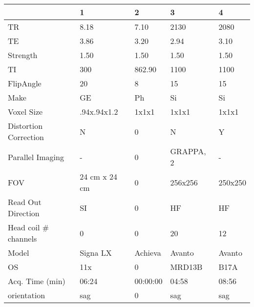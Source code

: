 \begin{table}
[]
\centering
\begin{tabular}{lllll}
\toprule
{} & 1 & 2 & 3 & 4 \\
\midrule
TR                    &               8.18 &               7.10 &                 2130 &                 2080 \\
TE                    &               3.86 &               3.20 &                 2.94 &                 3.10 \\
Strength              &               1.50 &               1.50 &                 1.50 &                 1.50 \\
TI                    &                300 &             862.90 &                 1100 &                 1100 \\
FlipAngle             &                 20 &                  8 &                   15 &                   15 \\
Make                  &                 GE &                 Ph &                   Si &                   Si \\
Voxel Size            &        .94x.94x1.2 &              1x1x1 &                1x1x1 &                1x1x1 \\
Distortion Correction &                  N &                  0 &                    N &                    Y \\
Parallel Imaging      &                  - &                  0 &            GRAPPA, 2 &                    - \\
FOV                   &      24 cm x 24 cm &                  0 &              256x256 &              250x250 \\
Read Out Direction    &                 SI &                  0 &                   HF &                   HF \\
Head coil \# channels  &                  0 &                  0 &                   20 &                   12 \\
Model                 &           Signa LX &            Achieva &               Avanto &               Avanto \\
OS                    &                11x &                  0 &               MRD13B &                 B17A \\
Acq. Time (min)       &           06:24 &           00:00:00 &             04:58 &             08:56 \\
orientation           &                sag &                  0 &                  sag &                  sag \\

\end{tabular}
\end{table}
